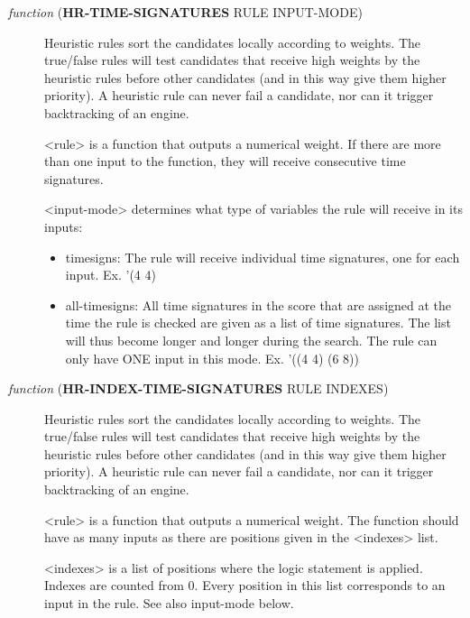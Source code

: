 \begin{description}
\item[{ \emph{function} (\textbf{HR-TIME-SIGNATURES} RULE INPUT-MODE)}] Heuristic rules sort the candidates locally according to weights. 
The true/false rules will test candidates that receive high weights by
the heuristic rules before other candidates (and in this way give them
higher priority). A heuristic rule can never fail a candidate, nor 
can it trigger backtracking of an engine. 

<rule> is a function that outputs a numerical weight. If there are 
more than one input to the function, they will receive consecutive 
time signatures.

<input-mode> determines what type of variables the rule will receive in 
its inputs:
\begin{itemize}
\item timesigns: The rule will receive individual time signatures, one for 
each input. Ex. '(4 4)
\item all-timesigns: All time signatures in the score that are assigned at the
time the rule is checked are given as a list of time   
signatures. The list will thus become longer and longer 
during the search. The rule can only have ONE input in 
this mode. Ex. '((4 4) (6 8))
\end{itemize}
\end{description}




\begin{description}
\item[{ \emph{function} (\textbf{HR-INDEX-TIME-SIGNATURES} RULE INDEXES)}] Heuristic rules sort the candidates locally according to weights. 
The true/false rules will test candidates that receive high weights by
the heuristic rules before other candidates (and in this way give them
higher priority). A heuristic rule can never fail a candidate, nor 
can it trigger backtracking of an engine. 

<rule> is a function that outputs a numerical weight. The function 
should have as many inputs as there are positions given in the 
<indexes> list.

<indexes> is a list of positions where the logic statement is applied.
Indexes are counted from 0. Every position in this list corresponds to
an input in the rule. See also input-mode below.
\end{description}





